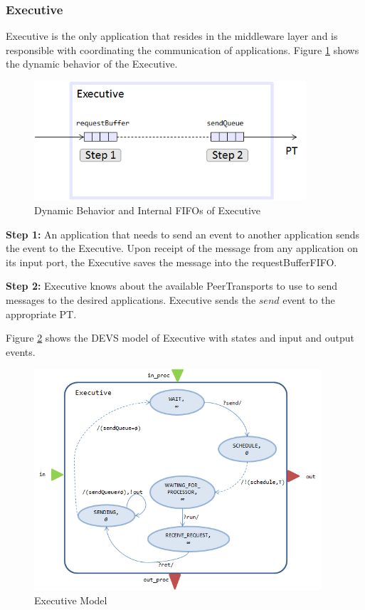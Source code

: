 \subsubsection{Executive}
Executive is the only application that resides in the middleware layer and is responsible with coordinating the communication of applications. Figure \ref{fig:executive_behavior} shows the dynamic behavior of the Executive.

\begin{figure}
 \centering
 \includegraphics[width=0.90\textwidth]{figures/executive_behavior.png}
 \caption{Dynamic Behavior and Internal FIFOs of Executive}
 \label{fig:executive_behavior}
\end{figure}

\textbf{Step 1:} An application that needs to send an event to another application sends the event to the Executive. Upon receipt of the message from any application on its input port, the Executive saves the message into the requestBufferFIFO. 

\textbf{Step 2:} Executive knows about the available PeerTransports to use to send messages to the desired applications. Executive sends the $send$ event to the appropriate PT. 

Figure \ref{fig:executivemodel1} shows the DEVS model of Executive with states and input and output events. 

\begin{figure}
	\centering
		\includegraphics[width=0.95\textwidth]{figures/executivemodel1.png}
	\caption{Executive Model}
	\label{fig:executivemodel1}
\end{figure}

